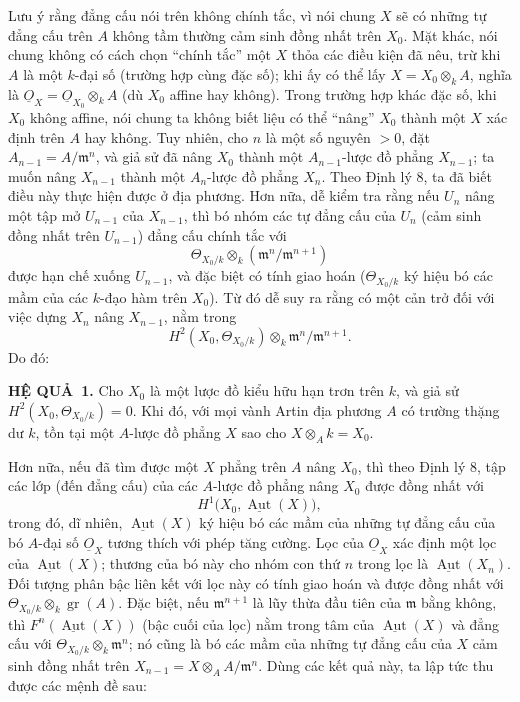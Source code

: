 \documentclass[11pt,twoside,openany]{book}
\numberwithin{equation}{section}
\newcommand{\Osh}{\underline{O}}
\newcommand{\result}[2]{\par\medskip\noindent\textbf{#1\if\relax\detokenize{#2}\relax\else\ #2\fi.}\quad}
\begin{document}
Lưu ý rằng đẳng cấu nói trên không chính tắc, vì nói chung $X$ sẽ có những tự
đẳng cấu trên $A$ không tầm thường cảm sinh đồng nhất trên $X_0$. Mặt khác,
nói chung không có cách chọn “chính tắc” một $X$ thỏa các điều kiện đã nêu,
trừ khi $A$ là một $k$-đại số (trường hợp cùng đặc số); khi ấy có thể lấy
$X=X_0\otimes_k A$, nghĩa là $\Osh_X=\Osh_{X_0}\otimes_k A$ (dù $X_0$ affine
hay không). Trong trường hợp khác đặc số, khi $X_0$ không affine, nói chung ta
không biết liệu có thể “nâng” $X_0$ thành một $X$ xác định trên $A$ hay không.
Tuy nhiên, cho $n$ là một số nguyên $>0$, đặt
$A_{n-1}=A/\mathfrak m^n$, và giả sử đã nâng $X_0$ thành một
$A_{n-1}$-lược đồ phẳng $X_{n-1}$; ta muốn nâng $X_{n-1}$ thành một
$A_n$-lược đồ phẳng $X_n$. Theo Định lý 8, ta đã biết điều này thực hiện được
ở địa phương. Hơn nữa, dễ kiểm tra rằng nếu $U_n$ nâng một tập mở $U_{n-1}$
của $X_{n-1}$, thì bó nhóm các tự đẳng cấu của $U_n$ (cảm sinh đồng nhất trên
$U_{n-1}$) đẳng cấu chính tắc với
\[
  \Theta_{X_0/k}\otimes_k(\mathfrak m^n/\mathfrak m^{n+1})
\]
được hạn chế xuống $U_{n-1}$, và đặc biệt có tính giao hoán
($\Theta_{X_0/k}$ ký hiệu bó các mầm của các $k$-đạo hàm trên $X_0$). Từ đó
dễ suy ra rằng có một cản trở đối với việc dựng $X_n$ nâng $X_{n-1}$, nằm
trong
\[
  H^2(X_0,\Theta_{X_0/k})\otimes_k
  \mathfrak m^n/\mathfrak m^{n+1}.
\]
Do đó:

\result{HỆ QUẢ}{1} Cho $X_0$ là một lược đồ kiểu hữu hạn trơn trên $k$, và
giả sử $H^2(X_0,\Theta_{X_0/k})=0$. Khi đó, với mọi vành Artin địa phương
$A$ có trường thặng dư $k$, tồn tại một $A$-lược đồ phẳng $X$ sao
cho $X\otimes_A k=X_0$.

Hơn nữa, nếu đã tìm được một $X$ phẳng trên $A$ nâng $X_0$, thì theo Định lý
8, tập các lớp (đến đẳng cấu) của các $A$-lược đồ phẳng nâng $X_0$ được đồng
nhất với
\[
  H^1\bigl(X_0,\underline{\operatorname{Aut}}(X)\bigr),
\]
trong đó, dĩ nhiên, $\underline{\operatorname{Aut}}(X)$ ký hiệu bó các mầm
của những tự đẳng cấu của bó $A$-đại số $\Osh_X$ tương thích với phép tăng
cường. Lọc của $\Osh_X$ xác định một lọc của
$\underline{\operatorname{Aut}}(X)$; thương của bó này cho nhóm con thứ
$n$ trong lọc là $\underline{\operatorname{Aut}}(X_n)$. Đối tượng phân bậc
liên kết với lọc này có tính giao hoán và được đồng nhất với
$\Theta_{X_0/k}\otimes_k\operatorname{gr}(A)$. Đặc biệt, nếu
$\mathfrak m^{n+1}$ là lũy thừa đầu tiên của $\mathfrak m$ bằng không, thì
$F^n(\underline{\operatorname{Aut}}(X))$ (bậc cuối của lọc) nằm trong tâm của
$\underline{\operatorname{Aut}}(X)$ và đẳng cấu với
$\Theta_{X_0/k}\otimes_k\mathfrak m^n$; nó cũng là bó các mầm của những tự
đẳng cấu của $X$ cảm sinh đồng nhất trên
$X_{n-1}=X\otimes_A A/\mathfrak m^n$. Dùng các kết quả này, ta lập tức thu
được các mệnh đề sau:
\end{document}
